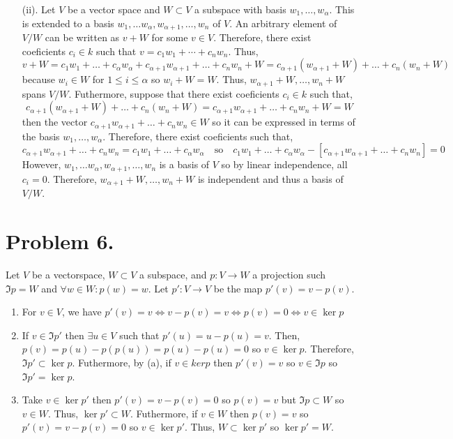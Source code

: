 \documentclass[12pt]{extarticle}
\begin{document}
\begin{enumerate}
\item[(ii).] 
Let $V$ be a vector space and $W \subset V$ a subspace with basis $w_1, \dots, w_\alpha$. This is extended to a basis $w_1, \dots w_\alpha, w_{\alpha + 1}, \dots, w_n$ of $V$.  An arbitrary element of $V/W$ can be written as $v + W$ for some $v \in V$. Therefore, there exist coeficients $c_i \in k$ such that $v = c_1 w_1 + \cdots + c_n w_n$. Thus,
\[ v + W = c_1 w_1 + \dots + c_\alpha w_\alpha + c_{\alpha + 1} w_{\alpha + 1} + \dots + c_n w_n + W = c_{\alpha + 1} (w_{\alpha + 1} + W) + \dots + c_n (w_n + W) \]  
because $w_i \in W$ for $1 \le i \le \alpha$ so $w_i + W = W$. Thus, $w_{\alpha + 1} + W, \dots, w_n + W$ spans $V/W$. Futhermore, suppose that there exist coeficients $c_i \in k$ such that,
\[ c_{\alpha + 1} (w_{\alpha + 1} + W) + \dots + c_n (w_n + W) = c_{\alpha + 1} w_{\alpha + 1} + \dots + c_n w_n + W  = W\]
then the vector $c_{\alpha + 1} w_{\alpha + 1} + \dots + c_n w_n \in W$ so it can be expressed in terms of the basis $w_1, \dots, w_\alpha$. Therefore, there exist coeficients such that,
\[c_{\alpha + 1} w_{\alpha + 1} + \dots + c_n w_n = c_1 w_1 + \dots + c_\alpha w_\alpha   \quad \text{so} \quad c_1 w_1 + \dots + c_\alpha w_\alpha  - \left[ c_{\alpha + 1} w_{\alpha + 1} + \dots + c_n w_n \right] = 0\]
However, $w_1, \dots w_\alpha, w_{\alpha + 1}, \dots, w_n$ is a basis of $V$ so by linear independence, all $c_i = 0$. Therefore, $w_{\alpha + 1} + W, \dots, w_n + W$ is independent and thus a basis of $V/W$.
\end{enumerate}

\section*{Problem 6.}
Let $V$ be a vectorspace, $W \subset V$ a subspace, and $p : V \to W$ a projection such $\Im{p} = W$ and $\forall w \in W : p(w) = w$. Let $p' : V \to V$ be the map $p'(v) = v - p(v)$. 

\begin{enumerate}
\item For $v \in V$, we have $p'(v) = v \iff v - p(v) = v \iff p(v) = 0 \iff v \in \ker{p}$
\item If $v \in \Im{p'}$ then $\exists u \in V$ such that $p'(u) = u - p(u) = v$. Then, $p(v) = p(u) - p(p(u)) = p(u) - p(u) = 0$ so $v \in \ker{p}$. Therefore, $\Im{p'} \subset \ker{p}$. Futhermore, by (a), if $v \in ker{p}$ then $p'(v) = v$ so $v \in \Im{p}$ so $\Im{p'} = \ker{p}$. 
\item Take $v \in \ker{p'}$ then $p'(v) = v - p(v) = 0$ so $p(v) = v$ but $\Im{p} \subset W$ so $v \in W$. Thus, $\ker{p'} \subset W$. Futhermore, if $v \in W$ then $p(v) = v$ so $p'(v) = v - p(v) = 0$ so $v \in \ker{p'}$. Thus, $W \subset \ker{p'}$ so $\ker{p'} = W$. 
\end{enumerate}
\end{document}
